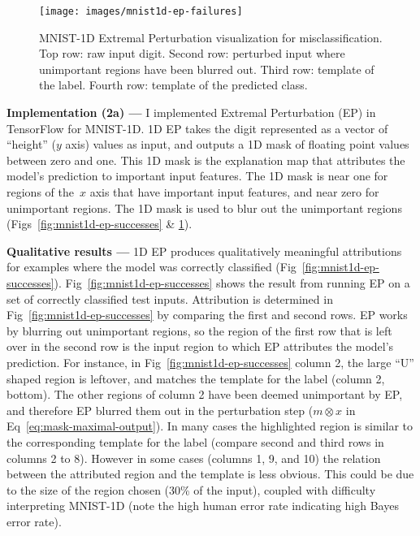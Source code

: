 \documentclass{article}
\newcommand{\myparagraph}[1]{\noindent\textbf{#1 ---}}
\begin{document}
\begin{figure}[ht]
	\texttt{[image: images/mnist1d-ep-failures]}
	\caption{\label{fig:mnist1d-ep-failures}MNIST-1D Extremal Perturbation visualization for misclassification.
		Top row: raw input digit.
		Second row: perturbed input where unimportant regions have been blurred out.
		Third row: template of the label.
		Fourth row: template of the predicted class.}
\end{figure}

\myparagraph{Implementation (2a)} I implemented Extremal Perturbation (EP) in TensorFlow for MNIST-1D\@.
1D EP takes the digit represented as a vector of ``height'' ($y$ axis) values as input, and outputs a 1D mask of floating point values between zero and one.
This 1D mask is the explanation map that attributes the model's prediction to important input features.
The 1D mask is near one for regions of the~$x$ axis that have important input features, and near zero for unimportant regions.
The 1D mask is used to blur out the unimportant regions (Figs~\ref{fig:mnist1d-ep-successes} \& \ref{fig:mnist1d-ep-failures}).


\myparagraph{Qualitative results} 1D EP produces qualitatively meaningful attributions for examples where the model was correctly classified (Fig~\ref{fig:mnist1d-ep-successes}).
Fig~\ref{fig:mnist1d-ep-successes} shows the result from running EP on a set of correctly classified test inputs.
Attribution is determined in Fig~\ref{fig:mnist1d-ep-successes} by comparing the first and second rows.
EP works by blurring out unimportant regions, so the region of the first row that is left over in the second row is the input region to which EP attributes the model's prediction.
For instance, in Fig~\ref{fig:mnist1d-ep-successes} column 2, the large ``U'' shaped region is leftover, and matches the template for the label (column 2, bottom).
The other regions of column 2 have been deemed unimportant by EP, and therefore EP blurred them out in the perturbation step ($m\otimes x$ in Eq~\ref{eq:mask-maximal-output}).
In many cases the highlighted region is similar to the corresponding template for the label (compare second and third rows in columns 2 to 8).
However in some cases (columns 1, 9, and 10) the relation between the attributed region and the template is less obvious.
This could be due to the size of the region chosen (30\% of the input), coupled with difficulty interpreting MNIST-1D (note the high human error rate indicating high Bayes error rate).
\end{document}
